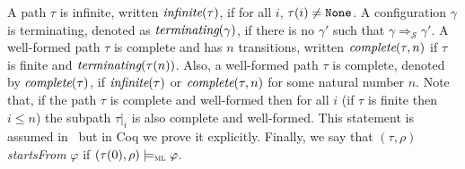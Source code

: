 \documentclass[conference]{IEEEtran}
\renewcommand{\S}{\mathcal{S}}
\newcommand{\tran}[2]{\Ra^{\!#1}_{\!#2}}
\newcommand{\Ra}{\Rightarrow}
\newcommand{\ML}{\textsc{ml}\xspace}
\newcommand{\modelsml}{\models_\ML}
\newcommand{\coq}[1]{{\small \textit{#1}}}
\newcommand{\coqtt}[1]{{\small \texttt{#1}}}
\begin{document}
A path $\tau$ is infinite, written $\coq{infinite}(\tau)$, if for all $i$, $\tau(i) \neq \coqtt{None}$. 
A configuration $\gamma$ is terminating, denoted as $\coq{terminating}(\gamma)$, if there is no $\gamma'$ such that $\gamma \tran{}{\S} \gamma'$.
A well-formed path $\tau$ is complete and has $n$ transitions, written $\coq{complete}(\tau, n)$ if $\tau$ is finite and $\coq{terminating}(\tau(n))$.
Also, a well-formed path $\tau$ is complete, denoted by $\coq{complete}(\tau)$, if $\coq{infinite}(\tau)$ or $\coq{complete}(\tau, n)$ for some natural number $n$.
Note that, if the path $\tau$ is complete and well-formed then for all $i$ (if $\tau$ is finite then $i \leq n$) the subpath $\tau|_i$ is also complete and well-formed.
This statement is assumed in~\cite{lucanu-rusu-arusoaie-nowak-LRC2015} but in Coq we prove it explicitly.
Finally, we say that $(\tau,\rho)$ \coq{startsFrom} $\varphi$ if  $(\tau(0), \rho) \modelsml \varphi$.
\end{document}
